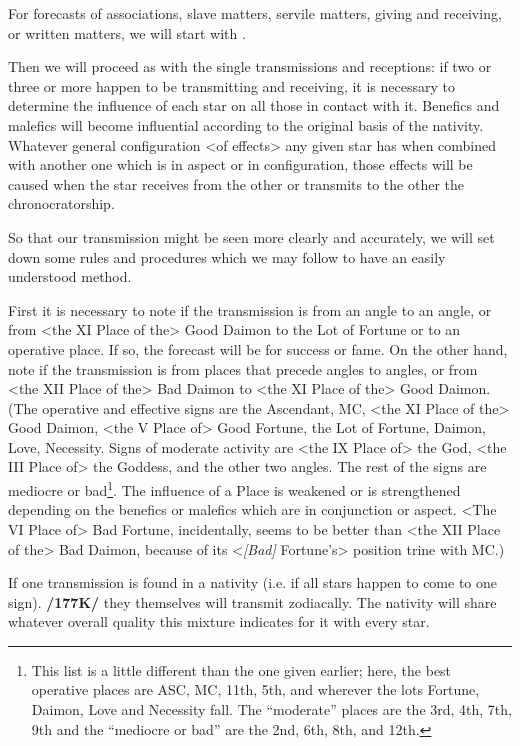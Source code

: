For forecasts of associations, slave matters, servile matters, giving and receiving, or written matters, we will start with \Mercury.

Then we will proceed as with the single transmissions and receptions: if two or three or more happen to be transmitting and receiving, it is necessary to determine the influence of each star on all those in contact with it. Benefics and malefics will become influential according to the original basis of the nativity. Whatever general configuration <of effects> any given star has when combined with another one
which is in aspect or in configuration, those effects will be caused when the star receives from the other or transmits to the other the chronocratorship.

So that our transmission might be seen more clearly and accurately, we will set down some rules and procedures which we may follow to have an easily understood method. 

First it is necessary to note if the transmission is from an angle to an angle, or from <the XI Place of the> Good Daimon to the Lot of Fortune or to an operative place. If so, the forecast will be for success or fame. On the other hand, note if the transmission is from places that precede angles to angles, or from <the XII Place of the> Bad Daimon
to <the XI Place of the> Good Daimon. (The operative and effective signs are the Ascendant, MC, <the XI Place of the> Good Daimon, <the V Place of> Good Fortune, the Lot of Fortune, Daimon, Love, Necessity. Signs of moderate activity are <the IX Place of> the God, <the III Place of> the Goddess, and the other two angles. The rest of the signs are mediocre or bad\footnote{This list is a little different than the one given earlier; here, the best operative places are ASC, MC, 11th, 5th, and wherever the lots Fortune, Daimon, Love and Necessity fall. The ``moderate'' places are the 3rd, 4th, 7th, 9th and the ``mediocre or bad'' are the 2nd, 6th, 8th, and 12th.}. The influence of a Place is weakened or is strengthened depending on the benefics or malefics which are in conjunction or aspect. <The VI Place of> Bad Fortune, incidentally, seems to be better than <the XII Place of the> Bad Daimon, because of its <\textsl{[Bad]} Fortune’s> position trine with MC.)

If one transmission is found in a nativity (i.e. if all stars happen to come to one sign). \textbf{/177K/} they themselves will transmit zodiacally. The nativity will share whatever overall quality this mixture indicates for it with every star. 

